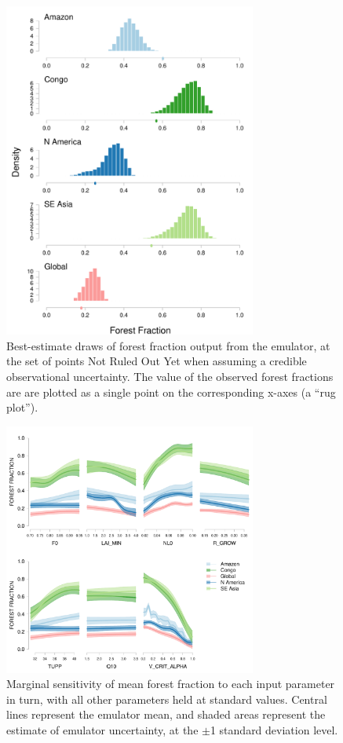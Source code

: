 \documentclass[esd, article]{copernicus} %
\begin{document}
\begin{figure}[t]
\includegraphics[width=8.3cm]{graphics/credible_NROY_hists.pdf}
\caption{Best-estimate draws of forest fraction output from the emulator, at the set of points Not Ruled Out Yet when assuming a credible observational uncertainty. The value of the observed forest fractions are are plotted as a single point on the corresponding x-axes (a ``rug plot'').}
\label{fig:credible_NROY_hists}
\end{figure}

\begin{figure}[t]
\includegraphics[width=8.3cm]{graphics/amaz_oat_sens.pdf}
\caption{Marginal sensitivity of mean forest fraction to each input parameter in turn, with all other parameters held at standard values. Central lines represent the emulator mean, and shaded areas represent the estimate of emulator uncertainty, at the $\pm$1 standard deviation level.}
\label{fig:amaz_oat_sens}
\end{figure}
\end{document}
